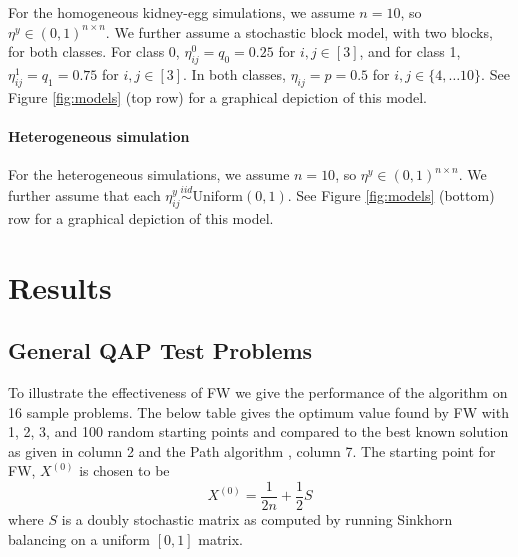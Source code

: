 For the homogeneous kidney-egg simulations, we assume $n=10$, so $\eta^y \in (0,1)^{n\times n}$.  We further assume a stochastic block model, with two blocks, for both classes.  For class 0, $\eta_{ij}^0=q_0=0.25$ for $i,j \in [3]$, and for class 1, $\eta_{ij}^1=q_1=0.75$ for $i,j \in [3]$.  In both classes, $\eta_{ij}=p=0.5$ for $i,j \in \{4,\ldots 10\}$.  See Figure \ref{fig:models} (top row) for a graphical depiction of this model.  



\paragraph{Heterogeneous simulation} %
\label{par:homogeneous_kidney_egg_simulation}

For the heterogeneous simulations, we assume $n=10$, so $\eta^y \in (0,1)^{n\times n}$.  We further assume that each $\eta_{ij}^y \overset{iid}{\sim}$Uniform$(0,1)$.  See Figure \ref{fig:models} (bottom) row for a graphical depiction of this model.










\section{Results} %
\label{sec:results}


\subsection{General QAP Test Problems}
To illustrate the effectiveness of FW 
we give the performance of the algorithm on 16 sample problems.  The below table gives the optimum value found by FW with 1, 2, 3, and 100 random starting points   and compared 
to the best known solution as given in column 2 and the Path algorithm  \cite{Path:2009}, column 7.   The starting point for FW, $X^{(0)}$ is chosen to be
$$X^{(0)}=\frac {1}{2n} + \frac{1}{2} S$$
where $S$ is a doubly stochastic matrix as computed by running Sinkhorn balancing on a uniform $[0,1]$ matrix.

